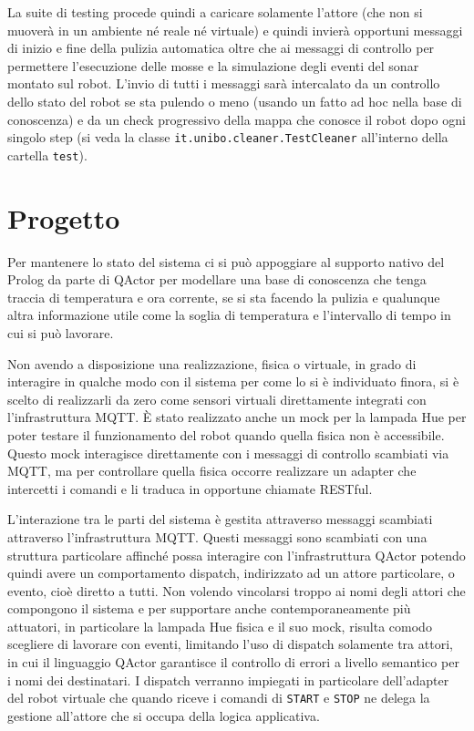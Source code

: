 La suite di testing procede quindi a caricare solamente l'attore (che non si muoverà in un ambiente né reale né virtuale) e quindi invierà opportuni messaggi di inizio e fine della pulizia automatica oltre che ai messaggi di controllo per permettere l'esecuzione delle mosse e la simulazione degli eventi del sonar montato sul robot. L'invio di tutti i messaggi sarà intercalato da un controllo dello stato del robot se sta pulendo o meno (usando un fatto ad hoc nella base di conoscenza) e da un check progressivo della mappa che conosce il robot dopo ogni singolo step (si veda la classe \texttt{it.unibo.cleaner.TestCleaner} all'interno della cartella \texttt{test}).

\section{Progetto}
Per mantenere lo stato del sistema ci si può appoggiare al supporto nativo del Prolog da parte di QActor per modellare una base di conoscenza che tenga traccia di temperatura e ora corrente, se si sta facendo la pulizia e qualunque altra informazione utile come la soglia di temperatura e l'intervallo di tempo in cui si può lavorare.

Non avendo a disposizione una realizzazione, fisica o virtuale, in grado di interagire in qualche modo con il sistema per come lo si è individuato finora, si è scelto di realizzarli da zero come sensori virtuali direttamente integrati con l'infrastruttura MQTT. È stato realizzato anche un mock per la lampada Hue per poter testare il funzionamento del robot quando quella fisica non è accessibile. Questo mock interagisce direttamente con i messaggi di controllo scambiati via MQTT, ma per controllare quella fisica occorre realizzare un adapter che intercetti i comandi e li traduca in opportune chiamate RESTful.

L'interazione tra le parti del sistema è gestita attraverso messaggi scambiati attraverso l'infrastruttura MQTT. Questi messaggi sono scambiati con una struttura particolare affinché possa interagire con l'infrastruttura QActor potendo quindi avere un comportamento dispatch, indirizzato ad un attore particolare, o evento, cioè diretto a tutti. Non volendo vincolarsi troppo ai nomi degli attori che compongono il sistema e per supportare anche contemporaneamente più attuatori, in particolare la lampada Hue fisica e il suo mock, risulta comodo scegliere di lavorare con eventi, limitando l'uso di dispatch solamente tra attori, in cui il linguaggio QActor garantisce il controllo di errori a livello semantico per i nomi dei destinatari. I dispatch verranno impiegati in particolare dell'adapter del robot virtuale che quando riceve i comandi di \texttt{START} e \texttt{STOP} ne delega la gestione all'attore che si occupa della logica applicativa.

